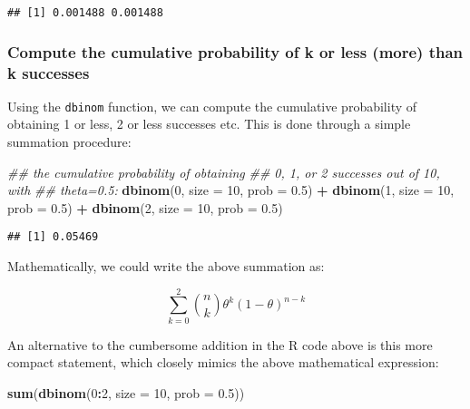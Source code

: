 \documentclass[12pt,]{krantz}
\newenvironment{Shaded}{\begin{snugshade}}{\end{snugshade}}
\newcommand{\CommentTok}[1]{\textcolor[rgb]{0.56,0.35,0.01}{\textit{#1}}}
\newcommand{\DataTypeTok}[1]{\textcolor[rgb]{0.13,0.29,0.53}{#1}}
\newcommand{\DecValTok}[1]{\textcolor[rgb]{0.00,0.00,0.81}{#1}}
\newcommand{\FloatTok}[1]{\textcolor[rgb]{0.00,0.00,0.81}{#1}}
\newcommand{\KeywordTok}[1]{\textcolor[rgb]{0.13,0.29,0.53}{\textbf{#1}}}
\newcommand{\NormalTok}[1]{#1}
\newcommand{\OperatorTok}[1]{\textcolor[rgb]{0.81,0.36,0.00}{\textbf{#1}}}
\newcommand{\StringTok}[1]{\textcolor[rgb]{0.31,0.60,0.02}{#1}}
\begin{document}
\begin{verbatim}
## [1] 0.001488 0.001488
\end{verbatim}

\hypertarget{compute-the-cumulative-probability-of-k-or-less-more-than-k-successes}{%
\subsubsection{Compute the cumulative probability of k or less (more) than k successes}\label{compute-the-cumulative-probability-of-k-or-less-more-than-k-successes}}

Using the \texttt{dbinom} function, we can compute the cumulative probability of obtaining 1 or less, 2 or less successes etc. This is done through a simple summation procedure:

\begin{Shaded}
\begin{Highlighting}[]
\CommentTok{## the cumulative probability of obtaining}
\CommentTok{## 0, 1, or 2 successes out of 10, with}
\CommentTok{## theta=0.5:}
\KeywordTok{dbinom}\NormalTok{(}\DecValTok{0}\NormalTok{, }\DataTypeTok{size =} \DecValTok{10}\NormalTok{, }\DataTypeTok{prob =} \FloatTok{0.5}\NormalTok{) }\OperatorTok{+}\StringTok{ }\KeywordTok{dbinom}\NormalTok{(}\DecValTok{1}\NormalTok{, }
  \DataTypeTok{size =} \DecValTok{10}\NormalTok{, }\DataTypeTok{prob =} \FloatTok{0.5}\NormalTok{) }\OperatorTok{+}\StringTok{ }\KeywordTok{dbinom}\NormalTok{(}\DecValTok{2}\NormalTok{, }\DataTypeTok{size =} \DecValTok{10}\NormalTok{, }
  \DataTypeTok{prob =} \FloatTok{0.5}\NormalTok{)}
\end{Highlighting}
\end{Shaded}

\begin{verbatim}
## [1] 0.05469
\end{verbatim}

Mathematically, we could write the above summation as:

\begin{equation}
\sum_{k=0}^2 \binom{n}{k} \theta^{k} (1-\theta)^{n-k} 
\end{equation}

An alternative to the cumbersome addition in the R code above is this more compact statement, which closely mimics the above mathematical expression:

\begin{Shaded}
\begin{Highlighting}[]
\KeywordTok{sum}\NormalTok{(}\KeywordTok{dbinom}\NormalTok{(}\DecValTok{0}\OperatorTok{:}\DecValTok{2}\NormalTok{, }\DataTypeTok{size =} \DecValTok{10}\NormalTok{, }\DataTypeTok{prob =} \FloatTok{0.5}\NormalTok{))}
\end{Highlighting}
\end{Shaded}
\end{document}
